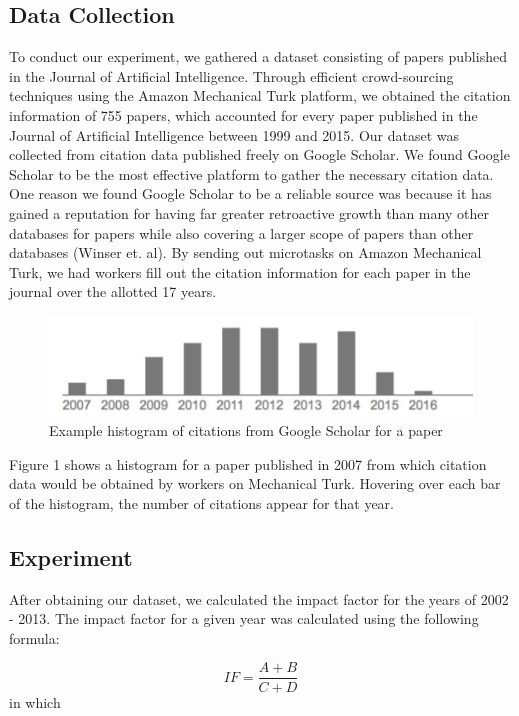 \documentclass[jair,twoside,11pt,theapa]{article}
\begin{document}
\subsection {Data Collection}
To conduct our experiment, we gathered a dataset consisting of papers published in the Journal of Artificial Intelligence. Through efficient crowd-sourcing techniques using the Amazon Mechanical Turk platform, we obtained the citation information of 755 papers, which accounted for every paper published in the Journal of Artificial Intelligence between 1999 and 2015. Our dataset was collected from citation data published freely on Google Scholar. We found Google Scholar to be the most effective platform to gather the necessary citation data. One reason we found Google Scholar to be a reliable source was because it has gained a reputation for having far greater retroactive growth than many other databases for papers while also covering a larger scope of papers than other databases (Winser et. al). By sending out microtasks on Amazon Mechanical Turk, we had workers fill out the citation information for each paper in the journal over the allotted 17 years. 
\begin{figure}[t]
\centerline{\includegraphics[scale=0.45]{fig1x}}
\caption{Example histogram of citations from Google Scholar for a paper}
\end{figure}

Figure 1 shows a histogram for a paper published in 2007 from which citation data would be obtained by workers on Mechanical Turk. Hovering over each bar of the histogram, the number of citations appear for that year. 
\subsection{Experiment}
After obtaining our dataset, we calculated the impact factor for the years of 2002 - 2013. The impact factor for a given year was calculated using the following formula: 

\begin{equation}
IF =  \frac{A + B}{C+D} 
\end{equation}
\noindent in which\\
\end{document}
